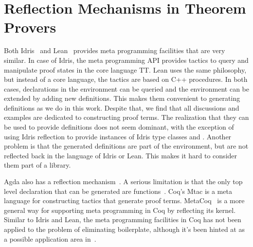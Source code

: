 \section{Reflection Mechanisms in Theorem Provers}
\label{sec:relwork:reflectionTPs}


Both Idris~\cite{brady2016reflection} and Lean~\cite{lean2017metaprogramming} provides meta programming facilities that are very similar.
In case of Idris, the meta programming API provides tactics to query and manipulate proof states in the core language TT. Lean uses the same philosophy, but instead of a core language, the tactics are based on C++ procedures. 
In both cases, declarations in the environment can be queried and the environment can be extended by adding new definitions. 
This makes them convenient to generating definitions as we do in this work. Despite that, we find that all discussions and examples are dedicated to constructing proof terms. The realization that they can be used to provide definitions does not seem dominant, with the exception of using Idris reflection to provide instances of Idris type classes  and . 
Another problem is that the generated definitions are part of the environment, but are not reflected back in the language of Idris or Lean. This makes it hard to consider them part of a library. 

Agda also has a reflection mechanism~\cite{van2012reflection}. A serious limitation is that the only top level declaration that can be generated are functions~\cite{agdaReflection}. 
Coq's Mtac is a meta language for constructing tactics that generate proof terms. MetaCoq~\cite{templateCoq2018} is a more general way for supporting meta programming in Coq by reflecting its kernel. Similar to Idris and Lean, the meta programming facilities in Coq has not been applied to the problem of eliminating boilerplate, although it's been hinted at as a possible application area in~\cite{templateCoq2018}. 


